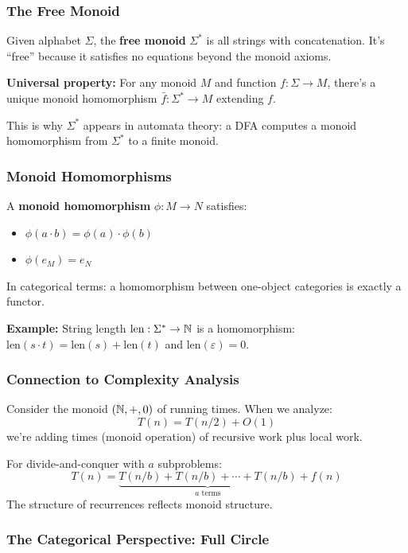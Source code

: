 \begin{goingdeeper}
\subsubsection*{The Free Monoid}

Given alphabet $\Sigma$, the \textbf{free monoid} $\Sigma^*$ is all strings with concatenation. It's ``free'' because it satisfies no equations beyond the monoid axioms.

\textbf{Universal property:} For any monoid $M$ and function $f: \Sigma \to M$, there's a unique monoid homomorphism $\bar{f}: \Sigma^* \to M$ extending $f$.

This is why $\Sigma^*$ appears in automata theory: a DFA computes a monoid homomorphism from $\Sigma^*$ to a finite monoid.

\subsubsection*{Monoid Homomorphisms}

A \textbf{monoid homomorphism} $\phi: M \to N$ satisfies:
\begin{itemize}
  \item $\phi(a \cdot b) = \phi(a) \cdot \phi(b)$
  \item $\phi(e_M) = e_N$
\end{itemize}

In categorical terms: a homomorphism between one-object categories is exactly a functor.

\textbf{Example:} String length $\text{len}: \Sigma^* \to \mathbb{N}$ is a homomorphism: $\text{len}(s \cdot t) = \text{len}(s) + \text{len}(t)$ and $\text{len}(\varepsilon) = 0$.

\subsubsection*{Connection to Complexity Analysis}

Consider the monoid $(\mathbb{N}, +, 0)$ of running times. When we analyze:
\[
T(n) = T(n/2) + O(1)
\]
we're adding times (monoid operation) of recursive work plus local work.

For divide-and-conquer with $a$ subproblems:
\[
T(n) = \underbrace{T(n/b) + T(n/b) + \cdots + T(n/b)}_{a \text{ terms}} + f(n)
\]
The structure of recurrences reflects monoid structure.

\subsubsection*{The Categorical Perspective: Full Circle}


\end{goingdeeper}
